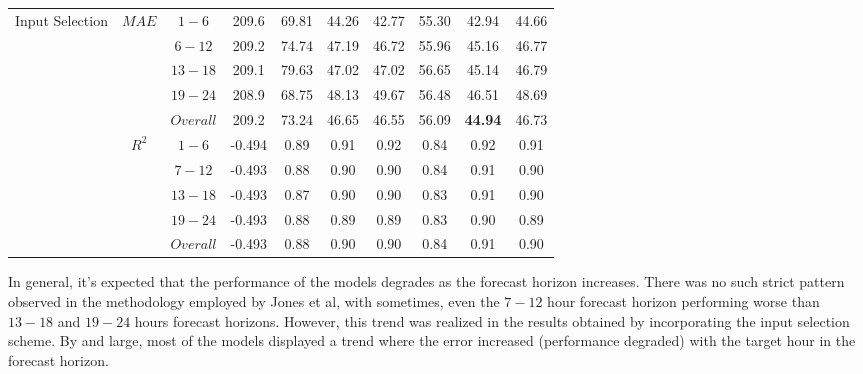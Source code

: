 \begin{table}[h]
\begin{center}
\begin{tabular}{@{}p{5.3em}ccccccccc@{}}
    & & & & & & & & & \\ 
    \midrule
    \multirow{10}{5em}{Input Selection}
                                              & \multirow{5}{*}{$MAE$} & $1 - 6$ & 209.6 & 69.81 & 44.26 & 42.77 & 55.30 & 42.94 & 44.66 \\
                                              &                   & $6 - 12$ & 209.2 & 74.74 & 47.19 & 46.72 & 55.96 & 45.16 & 46.77 \\
                                              &                   & $13 - 18$ & 209.1 & 79.63 & 47.02 & 47.02 & 56.65 & 45.14 & 46.79 \\
                                              &                   & $19 - 24$ & 208.9 & 68.75 & 48.13 & 49.67 & 56.48 & 46.51 & 48.69 \\
                                              &                   & $Overall$ & 209.2 & 73.24 & 46.65 & 46.55 & 56.09 & \textbf{44.94} & 46.73 \\ \cmidrule(lr){2-10}
                                              & \multirow{5}{*}{$R^2$} & $1 - 6$ & -0.494 & 0.89 & 0.91 & 0.92 & 0.84 & 0.92 & 0.91 \\
                                              &                   & $7 - 12$ & -0.493 & 0.88 & 0.90 & 0.90 & 0.84 & 0.91 & 0.90 \\
                                              &                   & $13 - 18$ & -0.493 & 0.87 & 0.90 & 0.90 & 0.83 & 0.91 & 0.90 \\
                                              &                   & $19 - 24$ & -0.493 & 0.88 & 0.89 & 0.89 & 0.83 & 0.90 & 0.89 \\
                                              &                   & $Overall$ & -0.493 & 0.88 & 0.90 & 0.90 & 0.84 & 0.91 & 0.90 \\ 
    \bottomrule
    \end{tabular}
\end{center}
\end{table}


\par In general, it's expected that the performance of the models degrades as the forecast horizon increases. There was no such strict pattern observed in the methodology employed by Jones et al, with sometimes, even the $7 - 12$ hour forecast horizon performing worse than $13 - 18$ and $19 - 24$ hours forecast horizons. However, this trend was realized in the results obtained by incorporating the input selection scheme. By and large, most of the models displayed a trend where the error increased (performance degraded) with the target hour in the forecast horizon.

